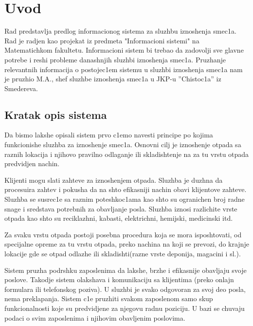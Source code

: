 \documentclass[10 pt]{article}
\begin{document}
	\newpage
	\renewcommand*\contentsname{Sadrzhaj:}
	\tableofcontents
	
	\newpage

		
	\section{Uvod}
	
	Rad predstavlja predlog informacionog sistema za sluzhbu iznoshenja smec1a. Rad je radjen kao projekat iz predmeta "Informacioni sistemi" na Matematichkom fakultetu. Informacioni sistem bi trebao da zadovolji sve glavne potrebe i reshi probleme danashnjih sluzhbi iznoshenja smec1a. Pruzhanje relevantnih informacija o postojec1em sistemu u sluzhbi iznoshenja smec1a nam je pruzhio M.A., shef sluzhbe iznoshenja smec1a u  JKP-u ''Chistoc1a'' iz Smedereva.
	
	\subsection{Kratak opis sistema}
	
	Da bismo lakshe opisali sistem prvo c1emo navesti principe po kojima funkcionishe sluzhba za iznoshenje smec1a. Osnovni cilj je iznoshenje otpada sa raznih lokacija i njihovo pravilno odlaganje ili skladishtenje na za tu vrstu otpada predvidjen nachin.
	
	Klijenti mogu slati zahteve za iznoshenjem otpada. Sluzhba je duzhna da procesuira zahtev i pokusha da na shto efikasniji nachin obavi klijentove zahteve. Sluzhba se susrec1e sa raznim poteshkoc1ama kao shto su ogranichen broj radne snage i sredstava potrebnih za obavljanje posla. Sluzhba iznosi razlichite vrste otpada kao shto su reciklazhni, kabasti, elektrichni, hemijski, medicinski itd.
	
	Za svaku vrstu otpada postoji posebna procedura koja se mora isposhtovati, od specijalne opreme za tu vrstu otpada, preko nachina na koji se prevozi, do krajnje lokacije gde se otpad odlazhe ili skladishti(razne vrste deponija, magacini i sl.).
	
	Sistem pruzha podrshku zaposlenima da lakshe, brzhe i efikasnije obavljaju svoje poslove. Takodje sistem olakshava i komunikaciju sa klijentima (preko onlajn formulara ili telefonskog poziva). U sluzhbi je svako odgovoran za svoj deo posla, nema preklapanja. Sistem c1e pruzhiti svakom zaposlenom samo skup funkcionalnosti koje su predvidjene za njegovu radnu poziciju. U bazi se chuvaju podaci o svim zaposlenima i njihovim obavljenim poslovima.
	
\end{document}
